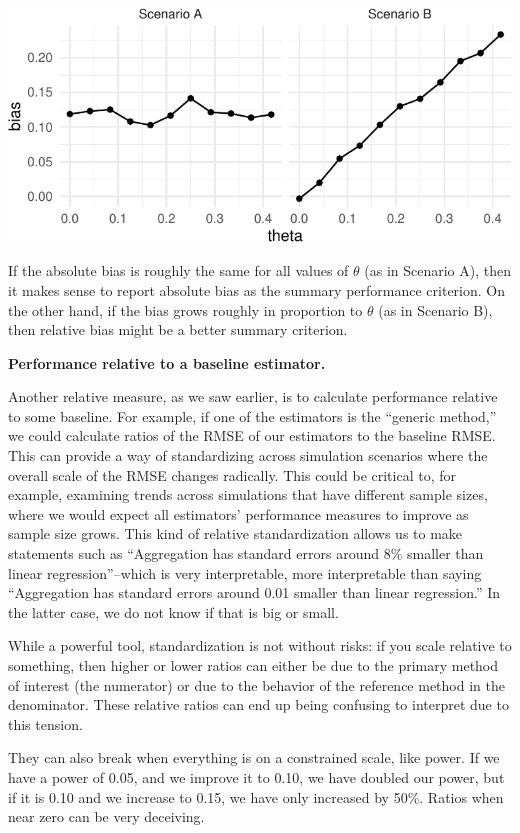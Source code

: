 \documentclass[
]{book}
\begin{document}
\begin{center}\includegraphics[width=0.75\linewidth]{Designing-Simulations-in-R_files/figure-latex/unnamed-chunk-107-1} \end{center}

If the absolute bias is roughly the same for all values of \(\theta\) (as in Scenario A), then it makes sense to report absolute bias as the summary performance criterion.
On the other hand, if the bias grows roughly in proportion to \(\theta\) (as in Scenario B), then relative bias might be a better summary criterion.

\textbf{Performance relative to a baseline estimator.}

Another relative measure, as we saw earlier, is to calculate performance relative to some baseline.
For example, if one of the estimators is the ``generic method,'' we could calculate ratios of the RMSE of our estimators to the baseline RMSE.
This can provide a way of standardizing across simulation scenarios where the overall scale of the RMSE changes radically.
This could be critical to, for example, examining trends across simulations that have different sample sizes, where we would expect all estimators' performance measures to improve as sample size grows.
This kind of relative standardization allows us to make statements such as ``Aggregation has standard errors around 8\% smaller than linear regression''--which is very interpretable, more interpretable than saying ``Aggregation has standard errors around 0.01 smaller than linear regression.''
In the latter case, we do not know if that is big or small.

While a powerful tool, standardization is not without risks: if you scale relative to something, then higher or lower ratios can either be due to the primary method of interest (the numerator) or due to the behavior of the reference method in the denominator.
These relative ratios can end up being confusing to interpret due to this tension.

They can also break when everything is on a constrained scale, like power.
If we have a power of 0.05, and we improve it to 0.10, we have doubled our power, but if it is 0.10 and we increase to 0.15, we have only increased by 50\%.
Ratios when near zero can be very deceiving.
\end{document}
